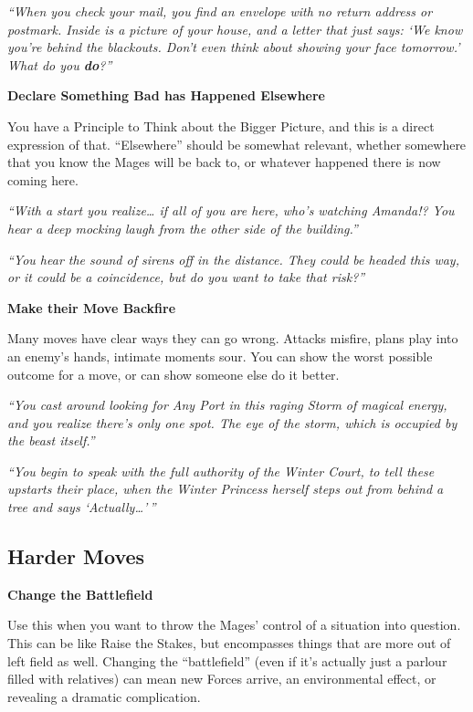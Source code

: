 \documentclass[
  oneside,
  statementpaper,
  9pt]{memoir}
\begin{document}
\emph{``When you check your mail, you find an envelope with no return
address or postmark. Inside is a picture of your house, and a letter
that just says: `We know you're behind the blackouts. Don't even think
about showing your face tomorrow.' What do you \textbf{do}?''}

\textbf{Declare Something Bad has Happened Elsewhere}

You have a Principle to Think about the Bigger Picture, and this is a
direct expression of that. ``Elsewhere'' should be somewhat relevant,
whether somewhere that you know the Mages will be back to, or whatever
happened there is now coming here.

\emph{``With a start you realize\ldots{} if all of you are here, who's
watching Amanda!? You hear a deep mocking laugh from the other side of
the building.''}

\emph{``You hear the sound of sirens off in the distance. They could be
headed this way, or it could be a coincidence, but do you want to take
that risk?''}

\textbf{Make their Move Backfire}

Many moves have clear ways they can go wrong. Attacks misfire, plans
play into an enemy's hands, intimate moments sour. You can show the
worst possible outcome for a move, or can show someone else do it
better.

\emph{``You cast around looking for Any Port in this raging Storm of
magical energy, and you realize there's only one spot. The eye of the
storm, which is occupied by the beast itself.''}

\emph{``You begin to speak with the full authority of the Winter Court,
to tell these upstarts their place, when the Winter Princess herself
steps out from behind a tree and says `Actually\ldots{}'\,''}

\hypertarget{harder-moves}{%
\subsection{Harder Moves}\label{harder-moves}}

\textbf{Change the Battlefield}

Use this when you want to throw the Mages' control of a situation into
question. This can be like Raise the Stakes, but encompasses things that
are more out of left field as well. Changing the ``battlefield'' (even
if it's actually just a parlour filled with relatives) can mean new
Forces arrive, an environmental effect, or revealing a dramatic
complication.
\end{document}

